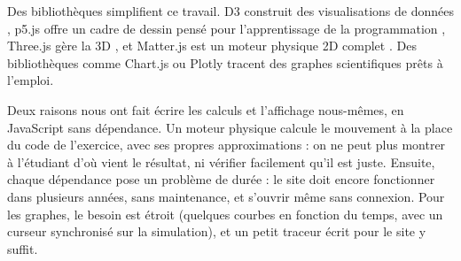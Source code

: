 Des bibliothèques simplifient ce travail. D3 construit des visualisations de
données \cite{bostock2011d3}, p5.js offre un cadre de dessin pensé pour
l'apprentissage de la programmation \cite{p5js}, Three.js gère la 3D
\cite{threejs}, et Matter.js est un moteur physique 2D complet
\cite{matterjs}. Des bibliothèques comme Chart.js ou Plotly tracent des
graphes scientifiques prêts à l'emploi.

Deux raisons nous ont fait écrire les calculs et l'affichage nous-mêmes, en
JavaScript sans dépendance. Un moteur physique calcule le mouvement à la
place du code de l'exercice, avec ses propres approximations : on ne peut
plus montrer à l'étudiant d'où vient le résultat, ni vérifier facilement
qu'il est juste. Ensuite, chaque dépendance pose un problème de durée : le
site doit encore fonctionner dans plusieurs années, sans maintenance, et
s'ouvrir même sans connexion. Pour les graphes, le besoin est étroit
(quelques courbes en fonction du temps, avec un curseur synchronisé sur la
simulation), et un petit traceur écrit pour le site y suffit.
